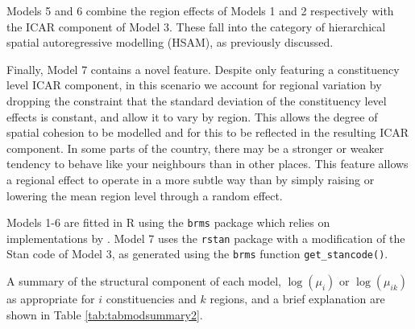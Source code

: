 \documentclass[webpdf,large,contemporary,namedate]{oup-authoring-template}
\theoremstyle{thmstyleone}
\theoremstyle{thmstyletwo}
\theoremstyle{thmstylethree}
\begin{document}
Models 5 and 6 combine the region effects of Models 1 and 2 respectively
with the ICAR component of Model 3. These fall into the category of
hierarchical spatial autoregressive modelling (HSAM), as previously
discussed.

Finally, Model 7 contains a novel feature. Despite only featuring a
constituency level ICAR component, in this scenario we account for
regional variation by dropping the constraint that the standard
deviation of the constituency level effects is constant, and allow it to
vary by region. This allows the degree of spatial cohesion to be
modelled and for this to be reflected in the resulting ICAR component.
In some parts of the country, there may be a stronger or weaker tendency
to behave like your neighbours than in other places. This feature allows
a regional effect to operate in a more subtle way than by simply raising
or lowering the mean region level through a random effect.

Models 1-6 are fitted in R using the \texttt{brms} package which relies
on implementations by \citet{Morris2019}. Model 7 uses the
\texttt{rstan} package \citep{rstan2024} with a modification of the Stan
code of Model 3, as generated using the \texttt{brms} function
\texttt{get\_stancode()}.

A summary of the structural component of each model, \(\log(\mu_i)\) or
\(\log(\mu_{ik})\) as appropriate for \(i\) constituencies and \(k\)
regions, and a brief explanation are shown in Table
\ref{tab:tabmodsummary2}.
\end{document}
